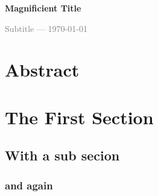 \documentclass[a4paper,12pt]{article}
\begin{document}

\thispagestyle{my_style}
\vspace*{0.5cm}  %
\enlargethispage{-1cm} %
\Huge %
\textbf{Magnificient Title}

\large
\textcolor{gray}{Subtitle --- \today}

\section*{Abstract}
\lipsum[1-2]
\section{The First Section}
\subsection{With a sub secion}
\subsubsection*{and again}

\lipsum[1-10]
\end{document}
